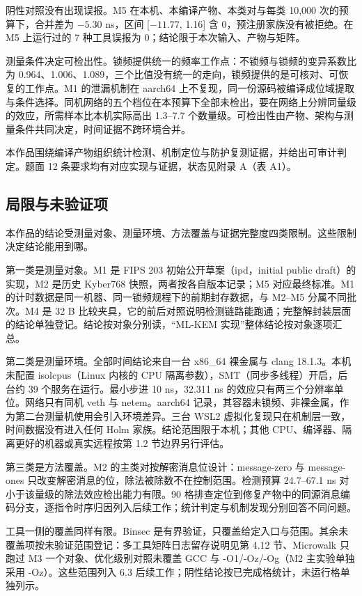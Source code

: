 阴性对照没有出现误报。M5 在本机、本编译产物、本类对与每类 10,000 次的预算下，合并差为 $-5.30$ ns，区间 [$-11.77$, 1.16] 含 0，预注册家族没有被拒绝。在 M5 上运行过的 7 种工具误报为 0；结论限于本次输入、产物与矩阵。%

测量条件决定可检出性。锁频提供统一的频率工作点：不锁频与锁频的变异系数比为 0.964、1.006、1.089，三个比值没有统一的走向，锁频提供的是可核对、可恢复的工作点。M1 的泄漏机制在 aarch64 上不复现，同一份源码被编译成位域提取与条件选择。同机网络的五个档位在本预算下全部未检出，要在网络上分辨同量级的效应，所需样本比本机实际高出 1.3--7.7 个数量级。可检出性由产物、架构与测量条件共同决定，时间证据不跨环境合并。%

本作品围绕编译产物组织统计检测、机制定位与防护复测证据，并给出可审计判定。题面 12 条要求均有对应实现与证据，状态见附录 A（表 A1）。

\subsection{局限与未验证项}

本作品的结论受测量对象、测量环境、方法覆盖与证据完整度四类限制。这些限制决定结论能用到哪。

第一类是测量对象。M1 是 FIPS 203\cite{fips203} 初始公开草案（ipd，initial public draft）的实现，M2 是历史 Kyber768\cite{kyber2018} 快照，两者按各自版本记录；M5 对应最终标准。M1 的计时数据是同一机器、同一锁频规程下的前期封存数据，与 M2--M5 分属不同批次。M4 是 32 B 比较夹具，它的前后对照说明检测链路能跑通；完整解封装层面的结论单独登记。结论按对象分别读，“ML-KEM 实现”整体结论按对象逐项汇总。

第二类是测量环境。全部时间结论来自一台 x86\_64 裸金属与 clang 18.1.3。本机未配置 isolcpus（Linux 内核的 CPU 隔离参数），SMT（同步多线程）开启，后台约 39 个服务在运行。最小步进 10 ns，32.311 ns 的效应只有两三个分辨率单位。网络只有同机 veth 与 netem。aarch64 记录，其容器未锁频、非裸金属，作为第二台测量机使用会引入环境差异。三台 WSL2 虚拟化复现只在机制层一致，时间数据没有进入任何 Holm 家族。结论范围限于本机；其他 CPU、编译器、隔离更好的机器或真实远程按第 1.2 节边界另行评估。%

第三类是方法覆盖。M2 的主类对按解密消息位设计：message-zero 与 message-ones 只改变解密消息的位，除法被除数不在控制范围。检测预算 24.7--67.1 ns 对小于该量级的除法效应检出能力有限。90 格排查定位到修复产物中的同源消息编码分支，逐指令时序归因列入后续工作；统计判定与机制发现分别回答不同问题。

工具一侧的覆盖同样有限。Binsec\cite{binsec} 是有界验证，只覆盖给定入口与范围。其余未覆盖项按未验证范围登记：多工具矩阵日志留存说明见第 4.12 节、Microwalk 只跑过 M3 一个对象、优化级别对照未覆盖 GCC 与 -O1/-Oz/-Og（M2 主实验单独采用 -Oz）。这些范围列入 6.3 后续工作；阴性结论按已完成格统计，未运行格单独列示。%

